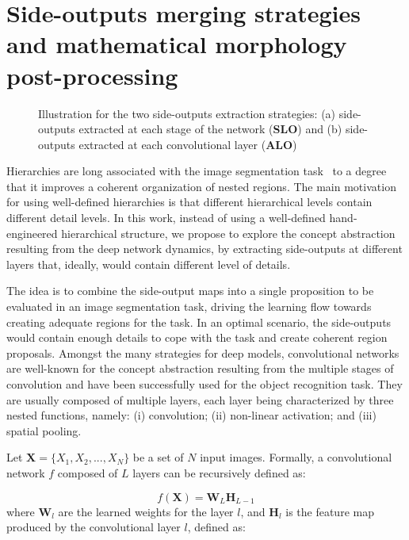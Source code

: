 \section{Side-outputs merging strategies and mathematical morphology post-processing}
\label{sec:method}


\begin{figure}[!t]
\centering
{}
\hfil
{}
\caption{Illustration for the two side-outputs extraction strategies:  (a) side-outputs extracted at each stage of the network (\textbf{SLO}) and (b) side-outputs extracted at each convolutional layer (\textbf{ALO})}
\label{fig:extraction}
\end{figure}

Hierarchies are long associated with the image segmentation task~\cite{jones97,cardelino06,najman12,xu16,cousty18} to a degree that it improves a coherent organization of nested regions. The main motivation for using well-defined hierarchies is that different hierarchical levels contain different detail levels. In this work, instead of using a well-defined hand-engineered hierarchical structure, we propose to explore the concept abstraction resulting from the deep network dynamics, by extracting side-outputs at different layers that, ideally, would contain different level of details.


The idea is to combine the side-output maps into a single proposition to be evaluated in an image segmentation task, driving the learning flow towards creating adequate regions for the task. In an optimal scenario, the side-outputs would contain enough details to cope with the task and create coherent region proposals. Amongst the many strategies for deep models, convolutional networks are well-known for the concept abstraction resulting from the multiple stages of convolution and have been successfully used for the object recognition task. They are usually composed of multiple layers, each layer being characterized by three nested functions, namely: (i) convolution; (ii) non-linear activation; and (iii) spatial pooling. 

Let $\mathbf{X}=\{X_1, X_2,...,X_N\}$ be a set of $N$ input images.
Formally, a convolutional network $\mathit{f}$ composed of $L$ layers can be recursively defined as:

\begin{equation}
\mathit{f}(\mathbf{X})=\mathbf{W}_L\mathbf{H}_{L-1}
\end{equation}
where $\mathbf{W}_l$ are the learned weights for the layer $l$, and $\mathbf{H}_l$ is the feature map produced by the convolutional layer $l$, defined as:

